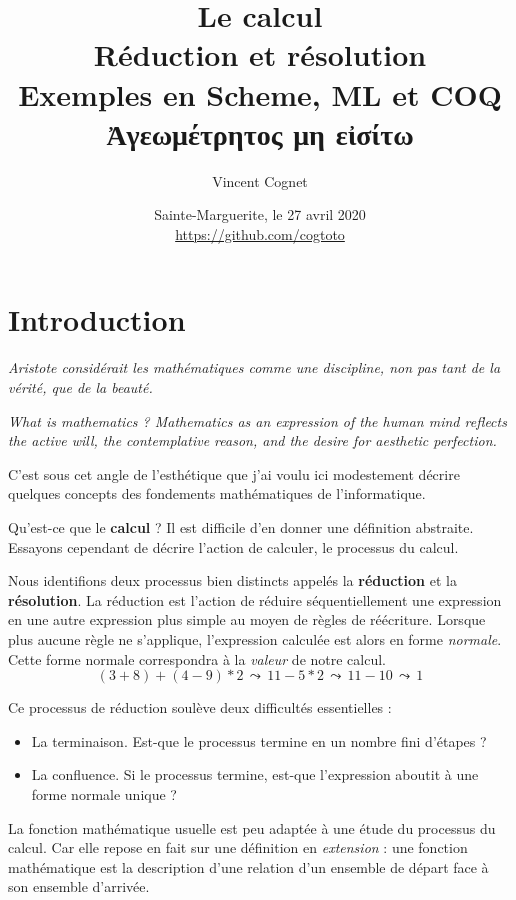 \documentclass[11pt]{book}
\title{Le calcul \\
     Réduction et résolution \\
	 Exemples en Scheme, ML et COQ \\ \vspace{1cm}
   \textgreek{Ἀγεωμέτρητος μη  εἰσίτω } \\
      }
\author{Vincent Cognet}
\date{Sainte-Marguerite, le 27 avril 2020 \\
      \url{https://github.com/cogtoto}}
\begin{document}
\maketitle
\tableofcontents

\chapter*{Introduction}

\textit{Aristote considérait les mathématiques comme une discipline, non pas tant de la vérité, que de la beauté.}
\cite{ab}


\textit{What is mathematics ? Mathematics as an expression of the human mind reflects
the active will, the contemplative reason, and the desire for aesthetic perfection.} \cite{wm}


C'est sous cet angle de l'esthétique que j'ai voulu ici modestement décrire quelques concepts 
 des fondements mathématiques de l'informatique.

 \vspace{0.5cm}

Qu'est-ce que le \textbf{calcul} ? Il est difficile d'en donner une définition abstraite. Essayons cependant de 
décrire l'action de calculer, le processus du calcul. 

Nous identifions deux processus bien distincts appelés la \textbf{réduction} et la \textbf{résolution}.
La réduction est l'action de réduire séquentiellement une expression en une autre expression plus simple
au moyen de règles de réécriture. Lorsque plus aucune règle ne s'applique, l'expression calculée est alors en forme
\textit{normale}. Cette forme normale correspondra à la \textit{valeur} de notre calcul.
$$(3+8)+(4-9)*2 \,\leadsto\,  11 -5*2 \, \leadsto\, 11 -10 \,\leadsto\, 1 $$

Ce processus de réduction soulève deux difficultés essentielles : 
\begin{itemize}
	\item La terminaison. Est-que le processus termine en un nombre fini d'étapes ?
	\item La confluence. Si le processus termine, est-que l'expression aboutit à une forme normale unique ?
\end{itemize}
\vspace{0.3cm}
La fonction mathématique usuelle est peu adaptée à une étude du processus du calcul. Car elle
repose en fait sur une définition en \textit{extension} : une fonction mathématique est la 
description d'une relation d'un ensemble de départ face à son ensemble d'arrivée.
\end{document}
